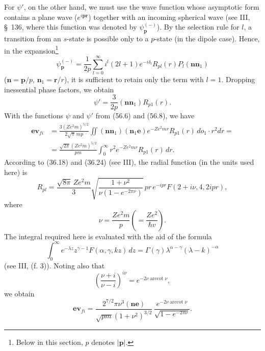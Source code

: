 For $\psi'$, on the other hand, we must use the wave function whose asymptotic form contains a plane wave ($e^{i\mathbf p\mathbf r}$) together with an incoming spherical wave (see III, \S~136, where this function was denoted by $\psi_{\mathbf p}^{(-)}$). By the selection rule for $l$, a transition from an $s$-state is possible only to a $p$-state (in the dipole case). Hence, in the expansion\footnote{Below in this section, $p$ denotes $|\mathbf p|$.}
\begin{equation}
\psi_{\mathbf p}^{(-)}
=\frac1{2p}\sum_{l=0}^{\infty}i^l(2l+1)e^{-i\delta_l}
R_{pl}(r)P_l(\mathbf n\mathbf n_1)
\tag{56.7}
\end{equation}
($\mathbf n=\mathbf p/p$, $\mathbf n_1=\mathbf r/r$), it is sufficient to retain only the term with $l=1$. Dropping inessential phase factors, we obtain
\begin{equation}
\psi'=\frac3{2p}(\mathbf n\mathbf n_1)R_{p1}(r).
\tag{56.8}
\end{equation}
With the functions $\psi$ and $\psi'$ from (56.6) and (56.8), we have
\[
\begin{aligned}
\mathbf e\mathbf v_{fi}
&=\frac{3(Ze^2m)^{5/2}}{2\sqrt\pi\,mp}
\iint(\mathbf n\mathbf n_1)(\mathbf n_1\mathbf e)
e^{-Ze^2mr}R_{p1}(r)\,do_1\cdot r^2dr={}\\
&=\frac{\sqrt{2\pi}(Ze^2m)^{5/2}}{pm}
\int_0^\infty r^2e^{-Ze^2mr}R_{p1}(r)\,dr.
\end{aligned}
\]
According to (36.18) and (36.24) (see III), the radial function (in the units used here) is
\[
R_{pl}=\frac{\sqrt{8\pi}\,Ze^2m}{3}
\sqrt{\frac{1+\nu^2}{\nu(1-e^{-2\pi\nu})}}\,
pr\,e^{-ipr}F(2+i\nu,4,2ipr),
\]
where
\begin{equation}
\nu=\frac{Ze^2m}{p}\left(=\frac{Ze^2}{\hbar v}\right).
\tag{56.9}
\end{equation}
The integral required here is evaluated with the aid of the formula
\[
\int_0^\infty e^{-\lambda z}z^{\gamma-1}F(\alpha,\gamma,kz)\,dz
=\Gamma(\gamma)\lambda^{\alpha-\gamma}(\lambda-k)^{-\alpha}
\]
(see III, (f. 3)). Noting also that
\[
\left(\frac{\nu+i}{\nu-i}\right)^{i\nu}
=e^{-2\nu\operatorname{arccot}\nu},
\]
we obtain
\[
\mathbf e\mathbf v_{fi}
=\frac{2^{7/2}\pi\nu^3(\mathbf n\mathbf e)}
{\sqrt{pm}(1+\nu^2)^{3/2}}\,
\frac{e^{-2\nu\operatorname{arccot}\nu}}
{\sqrt{1-e^{-2\pi\nu}}}.
\]

